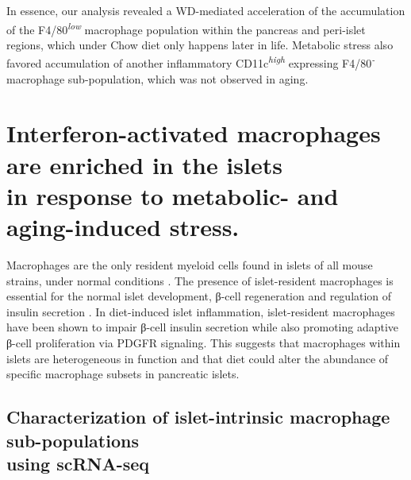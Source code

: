 In essence, our analysis revealed a WD-mediated acceleration of the accumulation of the F4/80\textsuperscript{\textit{low}} macrophage population within the pancreas and peri-islet regions, which under Chow diet only happens later in life. Metabolic stress also favored accumulation of another inflammatory CD11c\textsuperscript{\textit{high}} expressing F4/80\textsuperscript{\textit{-}} macrophage sub-population, which was not observed in aging.  

\clearpage
\section{Interferon-activated macrophages are enriched in the islets\\in response to metabolic- and aging-induced stress.}
\label{sec:sc_macs}

Macrophages are the only resident myeloid cells found in islets of all mouse strains, under normal conditions \textbf{\cite{zakharov_single-cell_2020}}. The presence of islet-resident macrophages is essential for the normal islet development, β-cell regeneration and regulation of insulin secretion \textbf{\cite{ying_expansion_2019}}. In diet-induced islet inflammation, islet-resident macrophages have been shown to impair β-cell insulin secretion while also promoting adaptive β-cell proliferation via PDGFR signaling. This suggests that macrophages within islets are heterogeneous in function and that diet could alter the abundance of specific macrophage subsets in pancreatic islets.

\subsection{Characterization of islet-intrinsic macrophage sub-populations\\using scRNA-seq\\}

